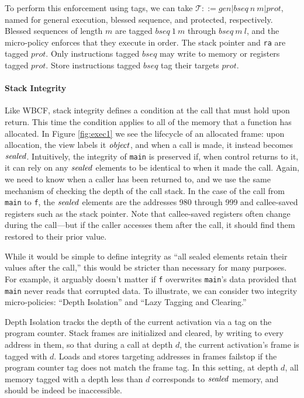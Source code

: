 \documentclass[10pt,conference]{ieeetran}%
\theoremstyle{definition}
\begin{document}
To perform this enforcement using tags, we can take
\(\mathcal{T} ::= \mathit{gen} | \mathit{bseq} ~ n ~ m | \mathit{prot}\), named for general
execution, blessed sequence, and protected, respectively. Blessed sequences of length \(m\) are
tagged \(\mathit{bseq} ~ 1 ~ m\) through \(\mathit{bseq} ~ m ~ l\), and the micro-policy enforces
that they execute in order. The stack pointer and {\tt ra}
are tagged \(\mathit{prot}\). Only instructions tagged \(\mathit{bseq}\) may write to memory
or registers tagged \(\mathit{prot}\). Store instructions tagged \(\mathit{bseq}\) tag their
targets \(\mathit{prot}\).

\paragraph*{Stack Integrity}

Like WBCF, stack integrity defines a condition at the call that must hold upon
return. This time the condition applies to all of the memory that a function has
allocated. In Figure \ref{fig:exec1} we see the lifecycle of an allocated frame:
upon allocation, the view labels it \(\mathit{object}\), and when a call is made, it instead
becomes \(\mathit{sealed}\). Intuitively, the integrity of {\tt main}
is preserved if, when control returns to it, it can rely on any \(\mathit{sealed}\) elements
to be identical to when it made the call.
%
Again, we need to know when a caller has been returned to,
and we use the same mechanism of checking the depth of the call stack.
%
In the case of the call from {\tt main} to {\tt f}, the \(\mathit{sealed}\) elements are the
addresses 980 through 999 and callee-saved registers such as
the stack pointer. Note that callee-saved registers often change
during the call---but if the caller accesses them after the call, it should find them
restored to their prior value.

While it would be simple to define integrity as ``all sealed elements retain their
values after the call,'' this would be stricter than necessary for many purposes.
For example, it arguably doesn't matter if {\tt f} overwrites {\tt main}'s data provided
that {\tt main} never reads that corrupted data.
To illustrate, we can consider two integrity micro-policies: ``Depth Isolation'' and
``Lazy Tagging and Clearing.''

Depth Isolation tracks the depth of the current activation via a tag on the program counter.
Stack frames are initialized and cleared, by writing
to every address in them, so that during a call at depth \(d\), the current activation's
frame is tagged with \(d\). Loads and stores targeting addresses in frames failstop
if the program counter tag does not match the frame tag. In this setting, at depth \(d\),
all memory tagged with a depth less than \(d\) corresponds to \(\mathit{sealed}\) memory,
and should be indeed be inaccessible. 
\end{document}
